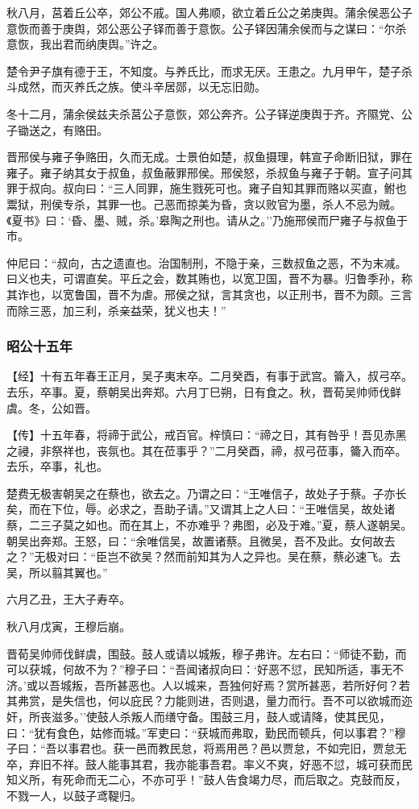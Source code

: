 \documentclass[]{article}
\begin{document}
秋八月，莒着丘公卒，郊公不戚。国人弗顺，欲立着丘公之弟庚舆。蒲余侯恶公子意恢而善于庚舆，郊公恶公子铎而善于意恢。公子铎因蒲余侯而与之谋曰：``尔杀意恢，我出君而纳庚舆。''许之。

楚令尹子旗有德于王，不知度。与养氏比，而求无厌。王患之。九月甲午，楚子杀斗成然，而灭养氏之族。使斗辛居郧，以无忘旧勋。

冬十二月，蒲余侯兹夫杀莒公子意恢，郊公奔齐。公子铎逆庚舆于齐。齐隰党、公子锄送之，有赂田。

晋邢侯与雍子争赂田，久而无成。士景伯如楚，叔鱼摄理，韩宣子命断旧狱，罪在雍子。雍子纳其女于叔鱼，叔鱼蔽罪邢侯。邢侯怒，杀叔鱼与雍子于朝。宣子问其罪于叔向。叔向曰：``三人同罪，施生戮死可也。雍子自知其罪而赂以买直，鲋也鬻狱，刑侯专杀，其罪一也。己恶而掠美为昏，贪以败官为墨，杀人不忌为贼。《夏书》曰：`昏、墨、贼，杀。'皋陶之刑也。请从之。''乃施邢侯而尸雍子与叔鱼于市。

仲尼曰：``叔向，古之遗直也。治国制刑，不隐于亲，三数叔鱼之恶，不为末减。曰义也夫，可谓直矣。平丘之会，数其贿也，以宽卫国，晋不为暴。归鲁季孙，称其诈也，以宽鲁国，晋不为虐。邢侯之狱，言其贪也，以正刑书，晋不为颇。三言而除三恶，加三利，杀亲益荣，犹义也夫！''

\hypertarget{header-n2620}{%
\subsubsection{昭公十五年}\label{header-n2620}}

【经】十有五年春王正月，吴子夷末卒。二月癸酉，有事于武宫。籥入，叔弓卒。去乐，卒事。夏，蔡朝吴出奔郑。六月丁巳朔，日有食之。秋，晋荀吴帅师伐鲜虞。冬，公如晋。

【传】十五年春，将禘于武公，戒百官。梓慎曰：``禘之日，其有咎乎！吾见赤黑之祲，非祭祥也，丧氛也。其在莅事乎？''二月癸酉，禘，叔弓莅事，籥入而卒。去乐，卒事，礼也。

楚费无极害朝吴之在蔡也，欲去之。乃谓之曰：``王唯信子，故处子于蔡。子亦长矣，而在下位，辱。必求之，吾助子请。''又谓其上之人曰：``王唯信吴，故处诸蔡，二三子莫之如也。而在其上，不亦难乎？弗图，必及于难。''夏，蔡人遂朝吴。朝吴出奔郑。王怒，曰：``余唯信吴，故置诸蔡。且微吴，吾不及此。女何故去之？''无极对曰：``臣岂不欲吴？然而前知其为人之异也。吴在蔡，蔡必速飞。去吴，所以翦其翼也。''

六月乙丑，王大子寿卒。

秋八月戊寅，王穆后崩。

晋荀吴帅师伐鲜虞，围鼓。鼓人或请以城叛，穆子弗许。左右曰：``师徒不勤，而可以获城，何故不为？''穆子曰：``吾闻诸叔向曰：`好恶不愆，民知所适，事无不济。'或以吾城叛，吾所甚恶也。人以城来，吾独何好焉？赏所甚恶，若所好何？若其弗赏，是失信也，何以庇民？力能则进，否则退，量力而行。吾不可以欲城而迩奸，所丧滋多。''使鼓人杀叛人而缮守备。围鼓三月，鼓人或请降，使其民见，曰：``犹有食色，姑修而城。''军吏曰：``获城而弗取，勤民而顿兵，何以事君？''穆子曰：``吾以事君也。获一邑而教民怠，将焉用邑？邑以贾怠，不如完旧，贾怠无卒，弃旧不祥。鼓人能事其君，我亦能事吾君。率义不爽，好恶不愆，城可获而民知义所，有死命而无二心，不亦可乎！''鼓人告食竭力尽，而后取之。克鼓而反，不戮一人，以鼓子鸢鞮归。
\end{document}
